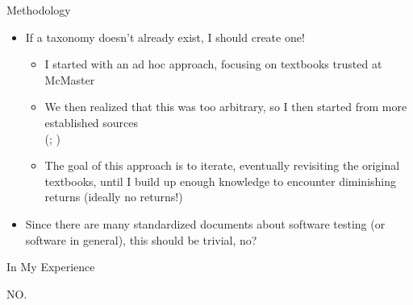 \documentclass[22pt]{beamer}
\begin{document}
\begin{frame}[fragile]
\begin{textblock}{7.25}
        \begin{block}{\fontsize{37}{20}\selectfont Methodology}
            \begin{itemize}
                \item If a taxonomy doesn't already exist, I should create one!
                      \begin{itemize}
                          \item I started with an ad hoc approach, focusing on
                                textbooks trusted at McMaster \\\citep{Patton2006,
                                    PetersAndPedrycz2000, vanVliet2000}
                          \item We then realized that this was too arbitrary, so
                                I then started from more established sources \\
                                (\citealp{IEEE2022, SWEBOK2024, SWEBOK2014,
                                    IEEE2017, ISO_IEC2023a}; )
                          \item The goal of this approach is to iterate,
                                eventually revisiting the original textbooks,
                                until I build up enough knowledge to encounter
                                diminishing returns (ideally no returns!)
                      \end{itemize}
                \item Since there are many standardized documents about software
                      testing (or software in general), this should be trivial, no?
            \end{itemize}
            \vspace{5mm}
        \end{block}

        \begin{block}{\fontsize{37}{20}\selectfont In My Experience}
            \vspace{5mm}
            \begin{center}
                {\fontsize{185}{20}\selectfont NO.}
            \end{center}
            \vspace{5mm}
        \end{block}
    \end{textblock}


\end{frame}
\end{document}
